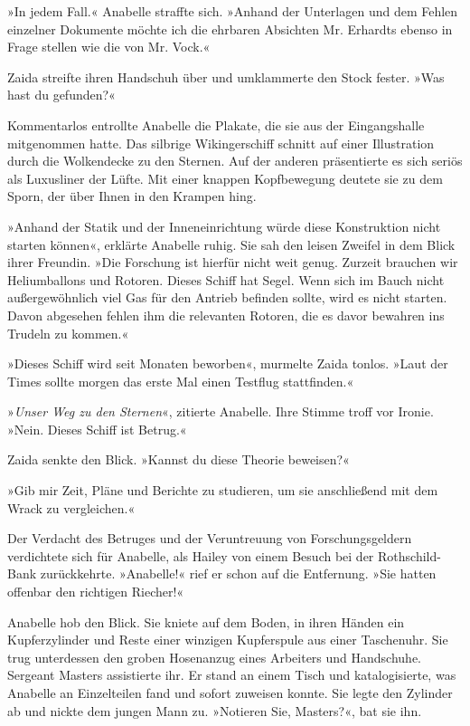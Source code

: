 »In jedem Fall.« Anabelle straffte sich. »Anhand der Unterlagen und
dem Fehlen einzelner Dokumente möchte ich die ehrbaren Absichten
Mr. Erhardts ebenso in Frage stellen wie die von Mr. Vock.«

Zaida streifte ihren Handschuh über und umklammerte den Stock
fester. »Was hast du gefunden?«

Kommentarlos entrollte Anabelle die Plakate, die sie aus der
Eingangshalle mitgenommen hatte. Das silbrige Wikingerschiff
schnitt auf einer Illustration durch die Wolkendecke zu den
Sternen. Auf der anderen präsentierte es sich seriös als Luxusliner
der Lüfte. Mit einer knappen Kopfbewegung deutete sie zu dem Sporn,
der über Ihnen in den Krampen hing.

»Anhand der Statik und der Inneneinrichtung würde diese
Konstruktion nicht starten können«, erklärte Anabelle ruhig. Sie
sah den leisen Zweifel in dem Blick ihrer Freundin. »Die Forschung
ist hierfür nicht weit genug. Zurzeit brauchen wir Heliumballons
und Rotoren. Dieses Schiff hat Segel. Wenn sich im Bauch nicht
außergewöhnlich viel Gas für den Antrieb befinden sollte, wird es
nicht starten. Davon abgesehen fehlen ihm die relevanten Rotoren,
die es davor bewahren ins Trudeln zu kommen.«

»Dieses Schiff wird seit Monaten beworben«, murmelte Zaida tonlos.
»Laut der Times sollte morgen das erste Mal einen Testflug
stattfinden.«

»\textit{Unser Weg zu den Sternen}«, zitierte Anabelle. Ihre Stimme troff
vor Ironie. »Nein. Dieses Schiff ist Betrug.«

Zaida senkte den Blick. »Kannst du diese Theorie beweisen?«

»Gib mir Zeit, Pläne und Berichte zu studieren, um sie anschließend
mit dem Wrack zu vergleichen.«

\tb

Der Verdacht des Betruges und der Veruntreuung von
Forschungsgeldern verdichtete sich für Anabelle, als Hailey von
einem Besuch bei der Rothschild-Bank zurückkehrte. »Anabelle!« rief
er schon auf die Entfernung. »Sie hatten offenbar den richtigen
Riecher!«

\bigpar

Anabelle hob den Blick. Sie kniete auf dem Boden, in ihren Händen
ein Kupferzylinder und Reste einer winzigen Kupferspule aus einer
Taschenuhr. Sie trug unterdessen den groben Hosenanzug eines
Arbeiters und Handschuhe. Sergeant Masters assistierte ihr. Er
stand an einem Tisch und katalogisierte, was Anabelle an
Einzelteilen fand und sofort zuweisen konnte. Sie legte den
Zylinder ab und nickte dem jungen Mann zu. »Notieren Sie,
Masters?«, bat sie ihn.

